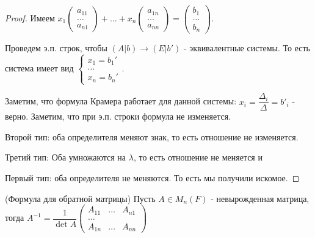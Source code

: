 \begin{proof}
	Имеем \(x_1\begin{pmatrix}
		a_{11} \\ \ldots \\ a_{n1}
	\end{pmatrix} + \ldots + x_n\begin{pmatrix}
	a_{1n} \\ \ldots \\ a_{nn}
	\end{pmatrix} = \begin{pmatrix}
	b_1 \\ \ldots \\ b_n
	\end{pmatrix}\). 
	
	Проведем э.п. строк, чтобы \((A|b)\to (E|b')\) - эквивалентные системы. То есть система имеет вид \(\left\{\begin{gathered}
	x_1 = b_1' \\ \ldots \\ x_n = b_n'
	\end{gathered}\right.\). 
	
	Заметим, что формула Крамера работает для данной системы: \(x_i = \dfrac{\Delta_i}{\Delta} = b'_i\) - верно. Заметим, что при э.п. строки формула не изменяется.
	
	Второй тип: оба определителя меняют знак, то есть отношение не изменяется. 
	
	Третий тип: Оба умножаются на $\lambda$, то есть отношение не меняется и 
	
	Первый тип: оба определителя не меняются. То есть мы получили искомое.
\end{proof}
\begin{theorem}
	(Формула для обратной матрицы) \newline
	Пусть \(A\in M_n(F)\) - невырожденная матрица, тогда \(A^{-1} = \dfrac{1}{\det A}\begin{pmatrix}
		A_{11} &\ldots & A_{n1} \\ 
		\ldots \\ 
		A_{1n} & \ldots &  A_{nn}
	\end{pmatrix}\)
\end{theorem}

